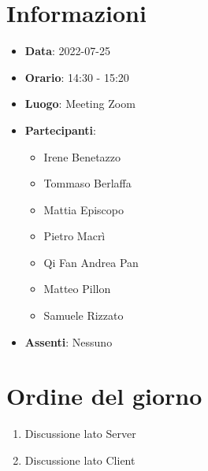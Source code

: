 \section{Informazioni}
	\begin{itemize}
		\item \textbf{Data}: 2022-07-25
		\item \textbf{Orario}: 14:30 - 15:20
		\item \textbf{Luogo}: Meeting Zoom
		\item \textbf{Partecipanti}:
		\begin{itemize}
			\item Irene Benetazzo
			\item Tommaso Berlaffa
			\item Mattia Episcopo
			\item Pietro Macrì
			\item Qi Fan Andrea Pan
			\item Matteo Pillon
			\item Samuele Rizzato
		\end{itemize}
        \item \textbf{Assenti}: Nessuno
	\end{itemize}
    
	\section{Ordine del giorno}
	\begin{enumerate}
		\item Discussione lato Server
		\item Discussione lato Client
	\end{enumerate}
	\newpage